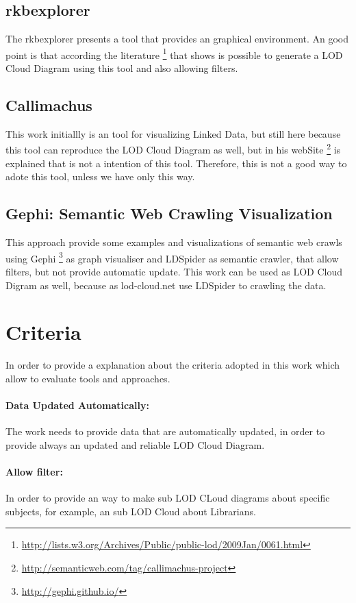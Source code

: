 \documentclass{iosart2c}
\begin{document}
\subsection{rkbexplorer} 
The rkbexplorer \cite{rbkexplorer} presents a tool that provides an graphical environment. An good point is that according the literature \footnote{\url{http://lists.w3.org/Archives/Public/public-lod/2009Jan/0061.html}} that shows is  possible to generate a LOD Cloud Diagram using this tool and also allowing filters.

\subsection{Callimachus}
This work initiallly \cite{callimachus} is an tool for visualizing Linked Data, but still here because this tool can reproduce the LOD Cloud Diagram as well, but in his webSite \footnote{ \url{http://semanticweb.com/tag/callimachus-project}} is explained that is not a intention of this tool. Therefore, this is not a good way to adote this tool, unless we have only this way.

\subsection{Gephi: Semantic Web Crawling Visualization}
This approach \cite{WebCrawlVis} provide some examples and visualizations of semantic web crawls using Gephi \footnote{\url{http://gephi.github.io/}} as graph visualiser and LDSpider as semantic crawler, that allow filters, but not provide automatic update.
This work can be used as LOD Cloud Digram as well, because as lod-cloud.net use LDSpider to crawling the data.


\section{Criteria}
In order to provide a explanation about the criteria adopted in this work which allow to evaluate tools and approaches.

\paragraph{Data Updated Automatically:} The work needs to provide data that are automatically updated, in order to provide always an updated and reliable LOD Cloud Diagram.

\paragraph{Allow filter:} In order to provide an way to make sub LOD CLoud diagrams about specific subjects, for example, an sub LOD Cloud about Librarians. 
\end{document}
